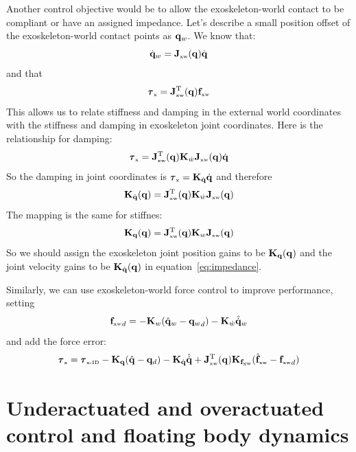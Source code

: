 \documentclass[letterpaper,12pt,fullpage]{article}
\newcommand{\myx}{{\mbox {\tiny x}}}
\newcommand{\xw}{{\mbox {\tiny xw}}}
\newcommand{\xinvdyn}{{\mbox {\tiny x-ID}}}
\begin{document}
Another control objective would be to allow the exoskeleton-world contact to
be compliant or have an assigned impedance.
Let's describe a small position offset of the exoskeleton-world
contact points as ${\bf q}_w$. We know that:
\begin{equation}
\dot{\vq}_w = \mJ_{\xw}(\vq) \dot{\vq}
\end{equation}
and that
\begin{equation}
\vtau_{\myx} = \mJ_{\xw}^{\tr}(\vq) \vf_{\xw} 
\end{equation}
This allows us to relate stiffness and damping in the external world coordinates
with the stiffness and damping in exoskeleton joint coordinates.
Here is the relationship for damping:
\begin{equation}
\vtau_{\myx} = \mJ_{\xw}^{\tr}(\vq) \mK_{\dot{w}} \mJ_{\xw}(\vq) \dot{\vq}
\end{equation}
So the damping in joint coordinates is $\vtau_{\myx} = \mK_{\dot{\vq}} \dot{\vq}$ and
therefore
\begin{equation}
\mK_{\dot{\vq}}(\vq) = \mJ_{\xw}^{\tr}(\vq) \mK_{\dot{w}} \mJ_{\xw}(\vq)
\end{equation}
The mapping is the same for stiffnes:
\begin{equation}
\mK_{\vq}(\vq) = \mJ_{\xw}^{\tr}(\vq) \mK_{w} \mJ_{\xw}(\vq)
\end{equation}
So we should assign the exoskeleton joint position gains to be ${\bf K}_{{\bf q}}({\bf q})$ and
the joint velocity gains to be ${\bf K}_{\dot{{\bf q}}}({\bf q})$ in equation~\ref{eq:impedance}.

Similarly, we can use exoskeleton-world force control to improve performance,
setting
\begin{equation}
{\vf_{\xw}}_d = - \mK_w ( \hat{\vq}_w - {\vq_w}_d ) - \mK_{\dot{w}} \hat{\dot{\vq}}_w
\end{equation}
and add the force error: 
\begin{equation}
\vtau_{\myx} = \vtau_{\xinvdyn} - \mK_{\vq} ( \hat{\vq} - \vq_d ) - \mK_{\dot{\vq}} \hat{\dot{\vq}}
+ \mJ_{\xw}^{\tr}(\vq) \mK_{\vf_{\xw}} ( \hat{\vf}_{\xw} - {\vf_{\xw}}_d )
\end{equation}

\section{Underactuated and overactuated control and floating body dynamics}
\label{sec:float}
\end{document}
